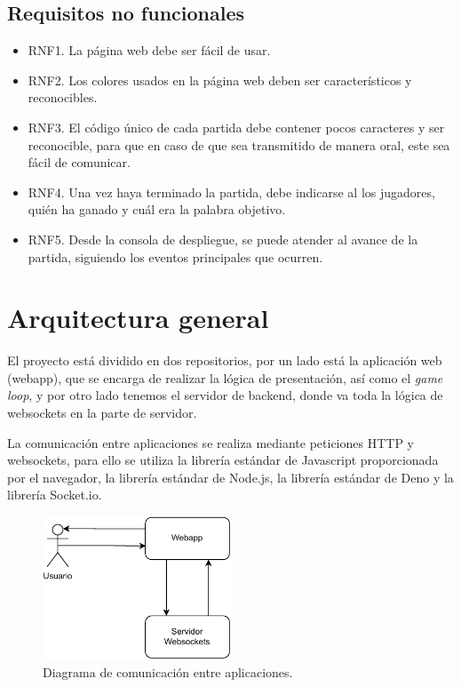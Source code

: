 \subsection{Requisitos no funcionales}

\begin{itemize}
	\item RNF1. La página web debe ser fácil de usar.
	\item RNF2. Los colores usados en la página web deben ser característicos y reconocibles.
	\item RNF3. El código único de cada partida debe contener pocos caracteres y ser reconocible, para que en caso de que sea transmitido de manera oral, este sea fácil de comunicar.
	\item RNF4. Una vez haya terminado la partida, debe indicarse al los jugadores, quién ha ganado y cuál era la palabra objetivo.
	\item RNF5. Desde la consola de despliegue, se puede atender al avance de la partida, siguiendo los eventos principales que ocurren.
\end{itemize}


\section{Arquitectura general}
El proyecto está dividido en dos repositorios, por un lado está la aplicación web (webapp), que se encarga de realizar la lógica de presentación, así como el \textit{game loop}, y por otro lado tenemos el servidor de backend, donde va toda la lógica de websockets en la parte de servidor.

La comunicación entre aplicaciones se realiza mediante peticiones HTTP y websockets, para ello se utiliza la librería estándar de Javascript proporcionada por el navegador, la librería estándar de Node.js, la librería estándar de Deno y la librería Socket.io.

\begin{figure}[H]
	\centering
	\includegraphics[clip=true,width=0.5\textwidth]{./diagrams/general_arch.pdf}
	\caption{Diagrama de comunicación entre aplicaciones.}
	\label{fig:ex_app_comms}
\end{figure}

